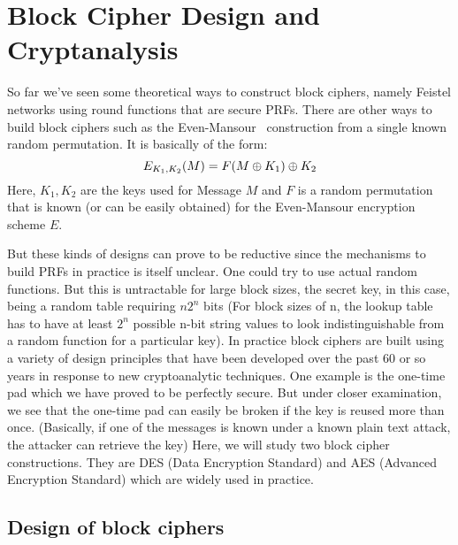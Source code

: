 \section{Block Cipher Design and Cryptanalysis}
\label{sec:cryptanalysis}

So far we've seen some theoretical ways to construct block ciphers, namely Feistel networks using round functions that are secure PRFs. There are other ways to build block ciphers such as the Even-Mansour~\cite{EvenMansour} construction from a single known random permutation. It is basically of the form: \newline
\[ E_{K_1, K_2}(M) = F(M {\:\oplus\:} K_1) {\:\oplus\:} K_2 \] 
Here, \( K_1, K_2 \) are the keys used for Message \(M\) and \(F\) is a random permutation that is known (or can be easily obtained) for the Even-Mansour encryption scheme \(E\). 
\par But these kinds of designs can prove to be reductive since the mechanisms to build PRFs in practice is itself unclear. One could try to use actual random functions. But this is untractable for large block sizes,  the secret key, in this case, being a random table requiring $n2^n$ bits
(For block sizes of n, the lookup table has to have at least $2^n$ possible n-bit string values to look indistinguishable from a random function for
a particular key). \newline
\indent In practice block ciphers are built using a variety of design principles that have been developed over the past 60 or so years in response to new cryptoanalytic techniques.\newline 
\indent One example is the one-time pad which we have proved to be perfectly secure. But under closer examination, we see that the one-time pad can easily be broken if the key is reused more than once. (Basically, if one of the messages is known under a known plain text attack, the attacker can retrieve the key) \newline
\indent Here, we will study two block cipher constructions. They are DES (Data Encryption Standard) and AES (Advanced Encryption Standard) which are widely used in practice.\newline \newline

\subsection{Design of block ciphers}

